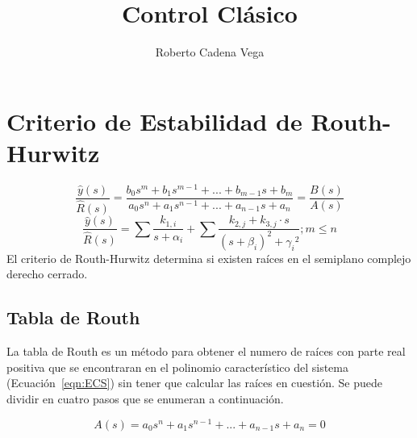 \documentclass[12pt]{article}
\title{Control Clásico}
\author{Roberto Cadena Vega}
\numberwithin{equation}{subsection}
\begin{document}
\maketitle

\newpage
\section{Criterio de Estabilidad de Routh-Hurwitz}

\begin{equation}
\frac{\hat{y}(s)}{\hat{R}(s)} = \frac{b_0 s^m + b_1 s^{m-1} + ... + b_{m-1} s + b_m}{a_0 s^n + a_1 s^{n-1} + ... + a_{n-1} s + a_n} = \frac{B(s)}{A(s)}
\end{equation}
\begin{equation}
\frac{\hat{y}(s)}{\hat{R}(s)} = \sum{\frac{k_{1,i}}{s + \alpha_i}} + \sum{\frac{k_{2,j} + k_{3,j} \cdot s}{(s + \beta_i)^2 + {\gamma_i}^2}} ; m \leq n
\end{equation}
El criterio de Routh-Hurwitz determina si existen raíces en el semiplano complejo derecho cerrado.

\subsection{Tabla de Routh}
La tabla de Routh es un método para obtener el numero de raíces con parte real positiva que se encontraran en el polinomio característico del sistema (Ecuación~\ref{eqn:ECS}) sin tener que calcular las raíces en cuestión.
Se puede dividir en cuatro pasos que se enumeran a continuación.

\begin{equation} \label{eqn:ECS}
A(s) = a_0 s^n + a_1 s^{n-1} + ... + a_{n-1} s + a_n = 0
\end{equation}
\end{document}

